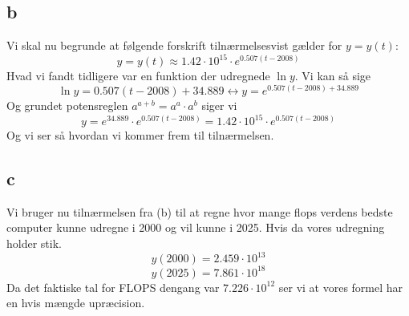 \documentclass[a4paper,fleqn]{article}
\begin{document}
	\subsection{b}
	Vi skal nu begrunde at følgende forskrift tilnærmelsesvist gælder for $y = y(t)$:
	\[ y = y(t) \approx 1.42\cdot 10^{15} \cdot e^{0.507(t-2008)}\]
	Hvad vi fandt tidligere var en funktion der udregnede $\ln y$. Vi kan så sige
	\[ \ln y = 0.507(t-2008) + 34.889 \leftrightarrow y = e^{0.507(t-2008) + 34.889}\]
	Og grundet potensreglen $a^{a+b} = a^{a} \cdot a^{b}$ siger vi
	\[ y = e^{34.889} \cdot e^{0.507(t-2008)} = 1.42\cdot10^{15} \cdot e^{0.507(t-2008)}\]
	Og vi ser så hvordan vi kommer frem til tilnærmelsen.

	\subsection{c}
	Vi bruger nu tilnærmelsen fra (b) til at regne hvor mange flops verdens bedste computer
	kunne udregne i 2000 og vil kunne i 2025. Hvis da vores udregning holder stik.
	\[ y(2000) = 2.459\cdot 10^{13}\]
	\[ y(2025) = 7.861\cdot10^{18}\]
	Da det faktiske tal for FLOPS dengang var $7.226\cdot 10^{12}$ ser vi at vores formel har
	en hvis mængde upræcision.
\end{document}
